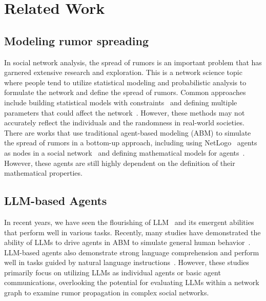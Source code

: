 \section{Related Work}
\label{sec:related_work}

\subsection{Modeling rumor spreading} 
In social network analysis, the spread of rumors is an important problem that has garnered extensive research and exploration. 
This is a network science topic where people tend to utilize statistical modeling and probabilistic analysis to formulate the network and define the spread of rumors. 
Common approaches include building statistical models with constraints~\cite{zehmakan2023rumorsspreadfastsocial} and defining multiple parameters that could affect the network~\cite{chen2020rumor}. 
However, these methods may not accurately reflect the individuals and the randomness in real-world societies.
There are works that use traditional agent-based modeling (ABM) to simulate the spread of rumors in a bottom-up approach, including using NetLogo~\cite{wilensky1999netlogo} agents as nodes in a social network~\cite{kaligotla2015agent} and defining mathematical models for agents~\cite{zehmakan2023rumorsspreadfastsocial}. 
However, these agents are still highly dependent on the definition of their mathematical properties.

\subsection{LLM-based Agents} 
In recent years, we have seen the flourishing of LLM~\cite{openai2024chatgpt} and its emergent abilities that perform well in various tasks. 
Recently, many studies have demonstrated the ability of LLMs to drive agents in ABM to simulate general human behavior~\cite{park2023Generate, chuang2024simulatingopiniondynamicsnetworks}.
LLM-based agents also demonstrate strong language comprehension and perform well in tasks guided by natural language instructions~\cite{chen2024scalablemultirobotcollaborationlarge}.
However, these studies primarily focus on utilizing LLMs as individual agents or basic agent communications, overlooking the potential for evaluating LLMs within a network graph to examine rumor propagation in complex social networks.



